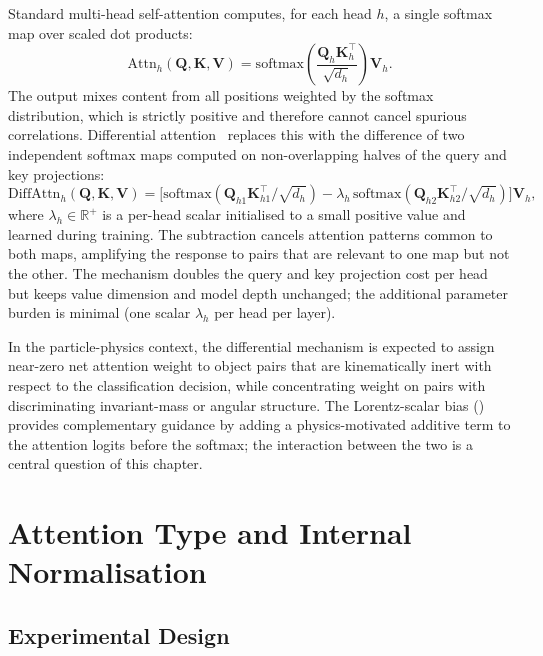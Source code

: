 Standard multi-head self-attention computes, for each head $h$, a single softmax map
over scaled dot products:
\begin{equation}
  \mathrm{Attn}_h(\mathbf{Q},\mathbf{K},\mathbf{V})
    = \mathrm{softmax}\!\left(\frac{\mathbf{Q}_h \mathbf{K}_h^\top}{\sqrt{d_h}}\right)\mathbf{V}_h.
\end{equation}
The output mixes content from all positions weighted by the softmax distribution, which
is strictly positive and therefore cannot cancel spurious correlations. Differential
attention~\cite{YE2025} replaces this with the difference of
two independent softmax maps computed on non-overlapping halves of the query and key
projections:
\begin{equation}
  \mathrm{DiffAttn}_h(\mathbf{Q},\mathbf{K},\mathbf{V})
    = \bigl[\mathrm{softmax}(\mathbf{Q}_{h1}\mathbf{K}_{h1}^\top/\sqrt{d_h})
            - \lambda_h\,\mathrm{softmax}(\mathbf{Q}_{h2}\mathbf{K}_{h2}^\top/\sqrt{d_h})\bigr]
      \mathbf{V}_h,
\end{equation}
where $\lambda_h \in \mathbb{R}^{+}$ is a per-head scalar initialised to a small
positive value and learned during training. The subtraction cancels attention patterns
common to both maps, amplifying the response to pairs that are relevant to one map but
not the other. The mechanism doubles the query and key projection cost per head but
keeps value dimension and model depth unchanged; the additional parameter burden is
minimal (one scalar $\lambda_h$ per head per layer).

In the particle-physics context, the differential mechanism is expected to assign near-zero
net attention weight to object pairs that are kinematically inert with respect to
the classification decision, while concentrating weight on pairs with discriminating
invariant-mass or angular structure. The Lorentz-scalar bias () provides
complementary guidance by adding a physics-motivated additive term to the attention
logits before the softmax; the interaction between the two is a central question of
this chapter.

\section{Attention Type and Internal Normalisation}
\label{sec:ch6_attn_type}

\subsection{Experimental Design}
\label{subsec:ch6_attn_design}

